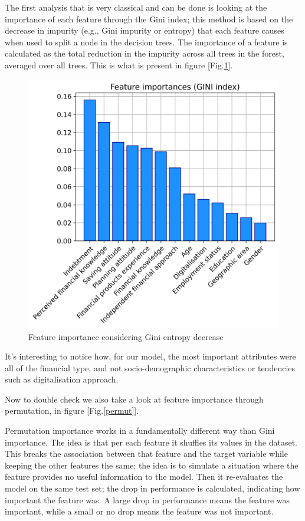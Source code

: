 \documentclass[a4paper,11pt]{article}
\begin{document}
The first analysis that is very classical and can be done is looking at the importance of each feature through the Gini index; this method is based on the decrease in impurity (e.g., Gini impurity or entropy) that each feature causes when used to split a node in the decision trees. The importance of a feature is calculated as the total reduction in the impurity across all trees in the forest, averaged over all trees. This is what is present in figure [Fig.\ref{Gini}].
\begin{figure}[H]
  \centering
        \includegraphics[width=12cm]{Gini_importance.png}
 \caption{Feature importance considering Gini entropy decrease}
 \label{Gini}
\end{figure}


It's interesting to notice how, for our model, the most important attributes were all of the financial type, and not socio-demographic characteristics or tendencies such as digitalisation approach. 


Now to double check we also take a look at feature importance through permutation, in figure [Fig.\ref{permut}].

Permutation importance works in a fundamentally different way than Gini importance. The idea is that per each feature it shuffles its values in the dataset. This breaks the association between that feature and the target variable while keeping the other features the same; the idea is to simulate a situation where the feature provides no useful information to the model. Then it re-evaluates the model on the same test set; the drop in performance is calculated, indicating how important the feature was. A large drop in performance means the feature was important, while a small or no drop means the feature was not important.
\end{document}
